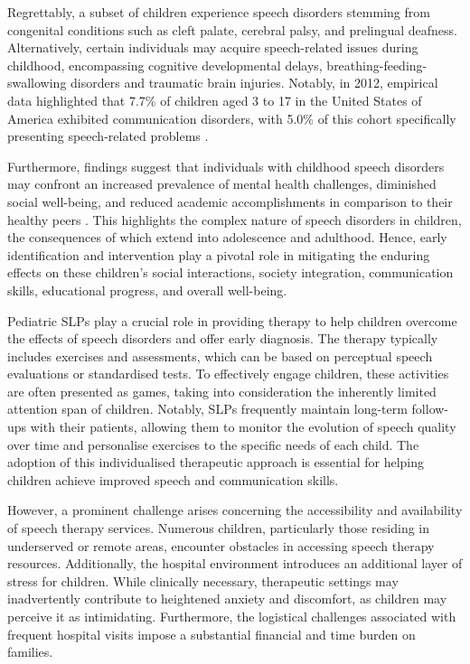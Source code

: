 Regrettably, a subset of children experience speech disorders stemming from congenital conditions such as cleft palate, cerebral palsy, and prelingual deafness. Alternatively, certain individuals may acquire speech-related issues during childhood, encompassing cognitive developmental delays, breathing-feeding-swallowing disorders and traumatic brain injuries. Notably, in 2012, empirical data highlighted that 7.7\% of children aged 3 to 17 in the United States of America exhibited communication disorders, with 5.0\% of this cohort specifically presenting speech-related problems \cite{black2015communication}.

Furthermore, findings suggest that individuals with childhood speech disorders may confront an increased prevalence of mental health challenges, diminished social well-being, and reduced academic accomplishments in comparison to their healthy peers \cite{langbecker2020long}. This highlights the complex nature of speech disorders in children, the consequences of which extend into adolescence and adulthood. Hence, early identification and intervention play a pivotal role in mitigating the enduring effects on these children's social interactions, society integration, communication skills, educational progress, and overall well-being.

Pediatric \acp{SLP} play a crucial role in providing therapy to help children overcome the effects of speech disorders and offer early diagnosis. The therapy typically includes exercises and assessments, which can be based on perceptual speech evaluations or standardised tests. To effectively engage children, these activities are often presented as games, taking into consideration the inherently limited attention span of children. Notably, \acp{SLP} frequently maintain long-term follow-ups with their patients, allowing them to monitor the evolution of speech quality over time and personalise exercises to the specific needs of each child. The adoption of this individualised therapeutic approach is essential for helping children achieve improved speech and communication skills.

However, a prominent challenge arises concerning the accessibility and availability of speech therapy services. Numerous children, particularly those residing in underserved or remote areas, encounter obstacles in accessing speech therapy resources. Additionally, the hospital environment introduces an additional layer of stress for children. While clinically necessary, therapeutic settings may inadvertently contribute to heightened anxiety and discomfort, as children may perceive it as intimidating. Furthermore, the logistical challenges associated with frequent hospital visits impose a substantial financial and time burden on families.

